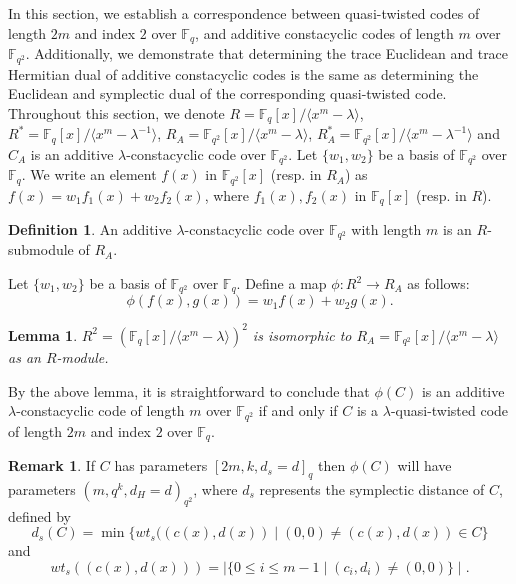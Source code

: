 \documentclass[12 pt]{extarticle}
\numberwithin{equation}{section}
\newtheorem{lemma}[theorem]{Lemma}
\theoremstyle{definition}
\newtheorem{definition}{Definition}[section]
\newtheorem{remark}{Remark}[section]
\begin{document}
In this section, we establish a correspondence between quasi-twisted codes of length $2m$ and index $2$ over $\mathbb{F}_q$, and additive constacyclic codes of length $m$ over $\mathbb{F}_{q^2}$. Additionally, we demonstrate that determining the trace Euclidean and trace Hermitian dual of additive constacyclic codes is the same as determining the Euclidean and symplectic dual of the corresponding quasi-twisted code. Throughout this section, we denote 
  $R=\mathbb{F}_q[x]/\langle x^m-\lambda\rangle$, $R^*=\mathbb{F}_q[x]/\langle x^m-\lambda^{-1}\rangle$, $R_A=\mathbb{F}_{q^2}[x]/\langle x^m-\lambda \rangle$, $R_A^*=\mathbb{F}_{q^2}[x]/\langle x^m-\lambda^{-1} \rangle$ and $C_A$ is an additive $\lambda$-constacyclic code over $\mathbb{F}_{q^2}$. Let $\{w_1,w_2\}$ be a basis of $\mathbb{F}_{q^2}$ over $\mathbb{F}_q$. We write an element $f(x)$ in $\mathbb{F}_{q^2}[x]$ (resp. in $R_A$) as $f(x)=w_1f_1(x)+w_2f_2(x)$, where $f_1(x),f_2(x)$ in $\mathbb{F}_q[x]$ (resp. in $R$).
\begin{definition}
    An additive $\lambda$-constacyclic code  over $\mathbb{F}_{q^2}$ with length $m$ is an $R$-submodule of $R_A$.
\end{definition}
Let $\{w_1,w_2\}$ be a basis of $\mathbb{F}_{q^2}$ over $\mathbb{F}_q$. Define a map $\phi: R^2\to R_A$  as follows:
$$\phi(f(x),g(x))=w_1f(x)+w_2g(x).$$

\begin{lemma}\label{qttoac}
    $R^2=(\mathbb{F}_q[x]/\langle x^m-\lambda\rangle )^2$ is isomorphic to $R_A=\mathbb{F}_{q^2}[x]/\langle x^m-\lambda \rangle$ as an $R$-module.
\end{lemma}
By the above lemma,  it is straightforward to conclude that $\phi(C)$ is an additive $\lambda$-constacyclic code of length $m$ over $\mathbb{F}_{q^2}$ if and only if $C$ is a $\lambda$-quasi-twisted code of length $2m$ and index $2$ over $\mathbb{F}_q$.
\begin{remark}
  If $C$ has parameters $[2m,k,d_s=d]_q$ then $\phi(C)$ will have parameters $(m,q^k,d_H=d)_{q^2}$, where $d_s$ represents the symplectic distance of $C$, defined by
  $$d_s(C)=\min \{wt_s((c(x),d(x))\mid (0,0)\neq (c(x),d(x))\in C\} $$ and
  $$wt_s((c(x),d(x)))=\mid \{0\leq i\leq m-1\mid (c_i,d_{i})\neq (0,0)\}\mid.$$
\end{remark}
\end{document}
